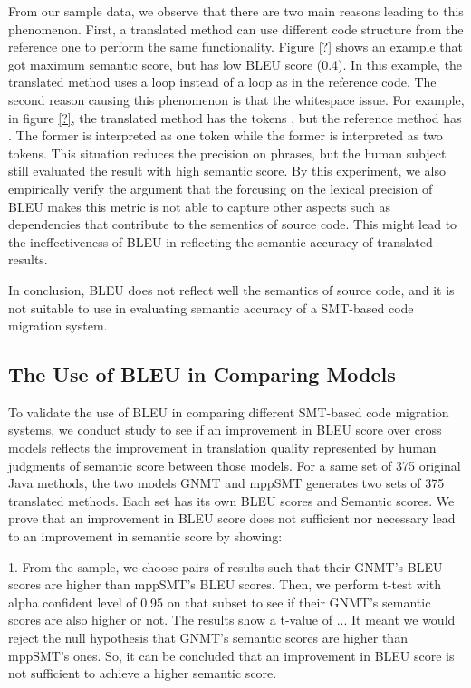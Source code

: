 From our sample data, we observe that there are two main reasons leading 
to this phenomenon.
%
First, a translated method can use different code structure from the 
reference one to perform the same functionality. Figure \ref{?} shows an example
that got maximum semantic score, but has low BLEU score (0.4). In this example, 
the translated method uses a  loop instead of a  
loop as in the reference code. The second reason causing this phenomenon 
is that the whitespace issue. For example, in figure \ref{?}, the translated method has the 
tokens , but the reference method has . The former 
is interpreted as one token while the former is interpreted as two tokens. 
This situation reduces the precision on phrases, but the human subject still
evaluated the result with high semantic score. By this experiment, we also empirically 
verify the argument that the forcusing on the lexical precision of BLEU makes
this metric is not able to capture other aspects such as dependencies 
that contribute to the sementics of source code. This might lead to the ineffectiveness
of BLEU in reflecting the semantic accuracy of translated results. 

In conclusion, BLEU does not reflect well the
semantics of source code, and it is not suitable to use in evaluating
semantic accuracy of a SMT-based code migration system.

\subsection{The Use of BLEU in Comparing Models}
To validate the use of BLEU in comparing different SMT-based code migration systems, we conduct study to see if an improvement in BLEU score over cross models reflects the improvement in translation quality represented by human judgments of semantic score between those models. For a same set of 375 original Java methods, the two models GNMT and mppSMT generates two sets of 375 translated methods. Each set has its own BLEU scores and Semantic scores.
We prove that an improvement in BLEU score does not sufficient nor necessary lead to an improvement in semantic score by showing:

1. From the sample, we choose pairs of results such that their GNMT's BLEU scores are higher than mppSMT's BLEU scores. Then, we perform t-test with alpha confident level of 0.95 on that subset to see if their GNMT's semantic scores are also higher or not. The results show a t-value of ... It meant we would reject the null hypothesis that GNMT's semantic scores are higher than mppSMT's ones. So, it can be concluded that an improvement in BLEU score is not sufficient to achieve a higher semantic score. 


